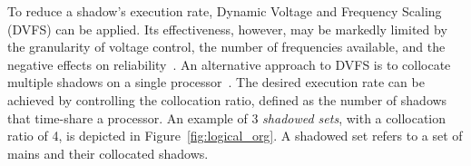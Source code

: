 





To reduce a shadow's execution rate, Dynamic Voltage and Frequency Scaling (DVFS) can be applied. 
Its effectiveness, however, may be markedly limited by the granularity of voltage control, the number of frequencies available, and the negative effects on reliability~\cite{Eyerman:2011:FDU:1952998.1952999}.  
An alternative approach to DVFS is to collocate multiple shadows on a single processor~\cite{cui_2016_scalcom}. The desired execution rate can be achieved by controlling the collocation ratio, defined as the number of shadows that time-share a processor. An example of 3 \textit{shadowed sets}, with a collocation ratio of 4, is depicted in Figure~\ref{fig:logical_org}. A shadowed set refers to a set of mains and their collocated shadows. 

